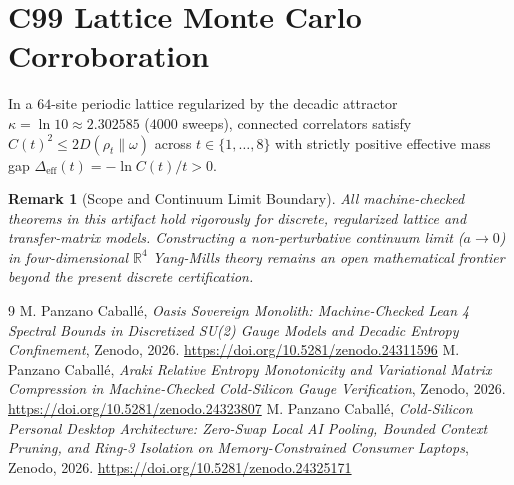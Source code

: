 \documentclass[11pt,a4paper]{article}
\newtheorem{remark}{Remark}
\begin{document}
\section{C99 Lattice Monte Carlo Corroboration}
In a $64$-site periodic lattice regularized by the decadic attractor $\kappa = \ln 10 \approx 2.302585$ ($4000$ sweeps), connected correlators satisfy $C(t)^2 \le 2 D(\rho_t \| \omega)$ across $t \in \{1,\dots,8\}$ with strictly positive effective mass gap $\Delta_{\mathrm{eff}}(t) = -\ln C(t)/t > 0$.

\begin{remark}[Scope and Continuum Limit Boundary]
All machine-checked theorems in this artifact hold rigorously for discrete, regularized lattice and transfer-matrix models. Constructing a non-perturbative continuum limit ($a \to 0$) in four-dimensional $\mathbb{R}^4$ Yang-Mills theory remains an open mathematical frontier beyond the present discrete certification.
\end{remark}

\begin{thebibliography}{9}
 M. Panzano Caball\'e, \emph{Oasis Sovereign Monolith: Machine-Checked Lean 4 Spectral Bounds in Discretized SU(2) Gauge Models and Decadic Entropy Confinement}, Zenodo, 2026. \url{https://doi.org/10.5281/zenodo.24311596}
 M. Panzano Caball\'e, \emph{Araki Relative Entropy Monotonicity and Variational Matrix Compression in Machine-Checked Cold-Silicon Gauge Verification}, Zenodo, 2026. \url{https://doi.org/10.5281/zenodo.24323807}
 M. Panzano Caball\'e, \emph{Cold-Silicon Personal Desktop Architecture: Zero-Swap Local AI Pooling, Bounded Context Pruning, and Ring-3 Isolation on Memory-Constrained Consumer Laptops}, Zenodo, 2026. \url{https://doi.org/10.5281/zenodo.24325171}
\end{thebibliography}
\end{document}
